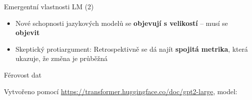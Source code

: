 \documentclass[aspectratio=169,dvipsnames]{beamer}
\begin{document}

\begin{frame}{Emergentní vlastnosti LM (2)}

    \begin{itemize}[<+->]

		\item Nové schopnosti jazykových modelů se \textbf{objevují s
				velikostí} -- musí se \textbf{objevit}

		\item Skeptický protiargument: Retrospektivně se dá najít
				\textbf{spojitá metrika}, která ukazuje, že změna je průběžná
					\citep{schaeffer2023emergent}

    \end{itemize}

\end{frame}


\begin{frame}{Férovost dat}

    \begin{center}


    \end{center}

    \centering




    {\tiny Vytvořeno pomocí \url{https://transformer.huggingface.co/doc/gpt2-large}, model: \citet{radford2019language}}


\end{frame}
\end{document}
